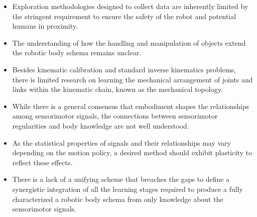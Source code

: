 \documentclass[12pt, a4paper]{article}
\begin{document}
\begin{enumerate}
\begin{itemize}
\item Exploration methodologies designed to collect data are inherently limited by the stringent requirement to ensure the safety of the robot and potential humans in proximity.

\item The understanding of how the handling and manipulation of objects extend the robotic body schema remains unclear.

\item Besides kinematic calibration and standard inverse kinematics problems, there is limited research on learning the mechanical arrangement of joints and links within the kinematic chain, known as the mechanical topology.

\item While there is a general consensus that embodiment shapes the relationships among sensorimotor signals, the connections between sensorimotor regularities and body knowledge are not well understood.

\item As the statistical properties of signals and their relationships may vary depending on the motion policy, a desired method should exhibit plasticity to reflect these effects.

\item There is a lack of a unifying scheme that breaches the gaps to define a synergistic integration of all the learning stages required to produce a fully characterized a robotic body schema from only knowledge about the sensorimotor signals.
	
	

\end{itemize}
\end{enumerate}
\end{document}

